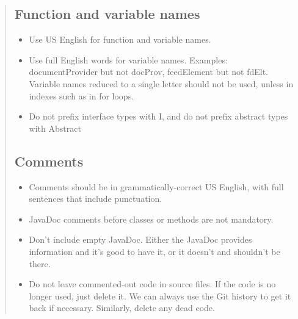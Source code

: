 \documentclass[11pt]{book}
\begin{document}
\begin{quotation}
\subsection{Function and variable names}
\begin{itemize}
    \item Use US English for function and variable names.
    \item Use full English words for variable names. Examples: documentProvider but not docProv, feedElement but not fdElt. Variable names reduced to a single letter should not be used, unless in indexes such as in for loops.
    \item Do not prefix interface types with I, and do not prefix abstract types with Abstract
\end{itemize}

\subsection{Comments}
\begin{itemize}
    \item Comments should be in grammatically-correct US English, with full sentences that include punctuation.
    \item JavaDoc comments before classes or methods are not mandatory.
    \item Don't include empty JavaDoc. Either the JavaDoc provides information and it's good to have it, or it doesn't and shouldn't be there.
    \item Do not leave commented-out code in source files. If the code is no longer used, just delete it. We can always use the Git history to get it back if necessary. Similarly, delete any dead code.
\end{itemize}


\end{quotation}
\end{document}

